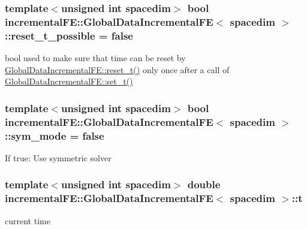 \subsubsection[{\texorpdfstring{reset\+\_\+t\+\_\+possible}{reset_t_possible}}]{\setlength{\rightskip}{0pt plus 5cm}template$<$unsigned int spacedim$>$ bool {\bf incremental\+F\+E\+::\+Global\+Data\+Incremental\+FE}$<$ spacedim $>$\+::reset\+\_\+t\+\_\+possible = false\hspace{0.3cm}{\ttfamily [private]}}\hypertarget{classincremental_f_e_1_1_global_data_incremental_f_e_a23a3040aa83a8867ccb0a8e88bb8cb9e}{}\label{classincremental_f_e_1_1_global_data_incremental_f_e_a23a3040aa83a8867ccb0a8e88bb8cb9e}
bool used to make sure that time can be reset by \hyperlink{classincremental_f_e_1_1_global_data_incremental_f_e_ab86938372e460e4253c5cc22edffbf94}{Global\+Data\+Incremental\+F\+E\+::reset\+\_\+t()} only once after a call of \hyperlink{classincremental_f_e_1_1_global_data_incremental_f_e_a27354ebc5bf9ec655f5c7cc16ac9876d}{Global\+Data\+Incremental\+F\+E\+::set\+\_\+t()} 
\subsubsection[{\texorpdfstring{sym\+\_\+mode}{sym_mode}}]{\setlength{\rightskip}{0pt plus 5cm}template$<$unsigned int spacedim$>$ bool {\bf incremental\+F\+E\+::\+Global\+Data\+Incremental\+FE}$<$ spacedim $>$\+::sym\+\_\+mode = false\hspace{0.3cm}{\ttfamily [private]}}\hypertarget{classincremental_f_e_1_1_global_data_incremental_f_e_a9986ee5bfccc1b5936c585cf0c5a4474}{}\label{classincremental_f_e_1_1_global_data_incremental_f_e_a9986ee5bfccc1b5936c585cf0c5a4474}
If {\ttfamily true\+:} Use symmetric solver 
\subsubsection[{\texorpdfstring{t}{t}}]{\setlength{\rightskip}{0pt plus 5cm}template$<$unsigned int spacedim$>$ double {\bf incremental\+F\+E\+::\+Global\+Data\+Incremental\+FE}$<$ spacedim $>$\+::t\hspace{0.3cm}{\ttfamily [private]}}\hypertarget{classincremental_f_e_1_1_global_data_incremental_f_e_abb14e15389af3772905a3c75e12ed2c0}{}\label{classincremental_f_e_1_1_global_data_incremental_f_e_abb14e15389af3772905a3c75e12ed2c0}
current time 

